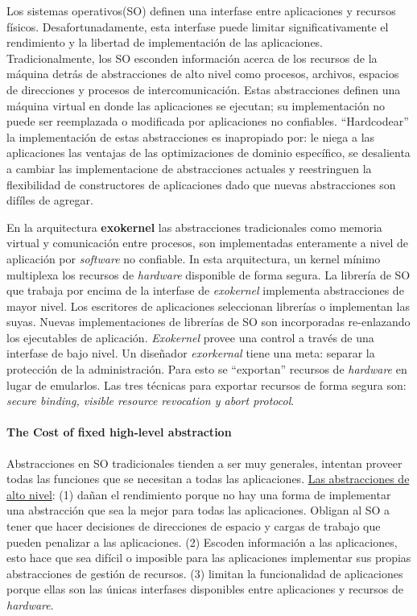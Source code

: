Los sistemas operativos(SO) definen una interfase entre aplicaciones y recursos físicos. Desafortunadamente, esta interfase puede limitar significativamente el rendimiento y la libertad de implementación de las aplicaciones. Tradicionalmente, los SO esconden información acerca de los recursos de la máquina detrás de abstracciones de alto nivel como procesos, archivos, espacios de direcciones y procesos de intercomunicación. Estas abstracciones definen una máquina virtual en donde las aplicaciones se ejecutan; su implementación no puede ser reemplazada o modificada por aplicaciones no confiables. ``Hardcodear'' la implementación de estas abstracciones es inapropiado por: le niega a las aplicaciones las ventajas de las optimizaciones de dominio específico, se desalienta a cambiar las implementacione de abstracciones actuales y reestringuen la flexibilidad de constructores de aplicaciones dado que nuevas abstracciones son difíles de agregar.

En la arquitectura \textbf{exokernel} las abstracciones tradicionales como memoria virtual y comunicación entre procesos, son implementadas enteramente a nivel de aplicación por \textit{software} no confiable. In esta arquitectura, un kernel mínimo multiplexa los recursos de \textit{hardware} disponible de forma segura. La librería de SO que trabaja por encima de la interfase de \textit{exokernel} implementa abstracciones de mayor nivel. Los escritores de aplicaciones seleccionan librerías o implementan las suyas. Nuevas implementaciones de librerías de SO son incorporadas re-enlazando los ejecutables de aplicación. \textit{Exokernel} provee una control a través de una interfase de bajo nivel. Un diseñador \textit{exorkernal} tiene una meta: separar la protección de la administración. Para esto se ``exportan'' recursos de \textit{hardware} en lugar de emularlos. Las tres técnicas para exportar recursos de forma segura son: \textit{secure binding, visible resource revocation \textnormal{y} 
abort protocol}.

\paragraph{\textnormal{\textbf{The Cost of fixed high-level abstraction}}}
Abstracciones en SO tradicionales tienden a ser muy generales, intentan proveer todas las funciones que se necesitan a todas las aplicaciones. \underline{Las abstracciones de alto nivel}: (1) dañan el rendimiento porque no hay una forma de implementar una abstracción que sea la mejor para todas las aplicaciones. Obligan al SO a tener que hacer decisiones de direcciones de espacio y cargas de trabajo que pueden penalizar a las aplicaciones. (2) Escoden información a las aplicaciones, esto hace que sea difícil o imposible para las aplicaciones implementar sus propias abstracciones de gestión de recursos. (3) limitan la funcionalidad de aplicaciones porque ellas son las únicas interfases disponibles entre aplicaciones y recursos de \textit{hardware}.

